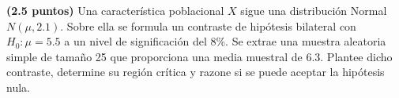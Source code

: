 
\textbf{(2.5 puntos)} Una característica poblacional $X$ sigue una distribución Normal $N(\mu,2.1)$. Sobre ella se formula un contraste de hipótesis bilateral con $H_0:\mu=5.5$ a un nivel de significación del 8\%. Se extrae una muestra aleatoria simple de tamaño 25 que proporciona una media muestral de 6.3. Plantee dicho contraste, determine su región crítica y razone si se puede aceptar la hipótesis nula.
